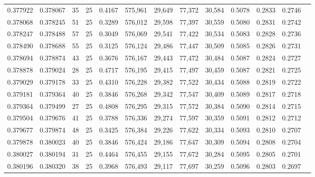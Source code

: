 \begin{tabular}{rrrrrrrrrrrrr}
0.377922 & 0.378067 &    35 &  25 &                                     0.4167 & 575,961 &  29,649 &  77,372 &  30,584 & 0.5078 & 0.2833 & 0.2746 \\
0.378068 & 0.378245 &    51 &  25 &                                     0.3289 & 576,012 &  29,598 &  77,397 &  30,559 & 0.5080 & 0.2831 & 0.2742 \\
0.378247 & 0.378488 &    57 &  25 &                                     0.3049 & 576,069 &  29,541 &  77,422 &  30,534 & 0.5083 & 0.2828 & 0.2736 \\
0.378490 & 0.378688 &    55 &  25 &                                     0.3125 & 576,124 &  29,486 &  77,447 &  30,509 & 0.5085 & 0.2826 & 0.2731 \\
0.378694 & 0.378874 &    43 &  25 &                                     0.3676 & 576,167 &  29,443 &  77,472 &  30,484 & 0.5087 & 0.2824 & 0.2727 \\
0.378878 & 0.379024 &    28 &  25 &                                     0.4717 & 576,195 &  29,415 &  77,497 &  30,459 & 0.5087 & 0.2821 & 0.2725 \\
0.379029 & 0.379178 &    33 &  25 &                                     0.4310 & 576,228 &  29,382 &  77,522 &  30,434 & 0.5088 & 0.2819 & 0.2722 \\
0.379181 & 0.379364 &    40 &  25 &                                     0.3846 & 576,268 &  29,342 &  77,547 &  30,409 & 0.5089 & 0.2817 & 0.2718 \\
0.379364 & 0.379499 &    27 &  25 &                                     0.4808 & 576,295 &  29,315 &  77,572 &  30,384 & 0.5090 & 0.2814 & 0.2715 \\
0.379504 & 0.379676 &    41 &  25 &                                     0.3788 & 576,336 &  29,274 &  77,597 &  30,359 & 0.5091 & 0.2812 & 0.2712 \\
0.379677 & 0.379874 &    48 &  25 &                                     0.3425 & 576,384 &  29,226 &  77,622 &  30,334 & 0.5093 & 0.2810 & 0.2707 \\
0.379878 & 0.380023 &    40 &  25 &                                     0.3846 & 576,424 &  29,186 &  77,647 &  30,309 & 0.5094 & 0.2808 & 0.2704 \\
0.380027 & 0.380194 &    31 &  25 &                                     0.4464 & 576,455 &  29,155 &  77,672 &  30,284 & 0.5095 & 0.2805 & 0.2701 \\
0.380196 & 0.380320 &    38 &  25 &                                     0.3968 & 576,493 &  29,117 &  77,697 &  30,259 & 0.5096 & 0.2803 & 0.2697 \\

\end{tabular}
